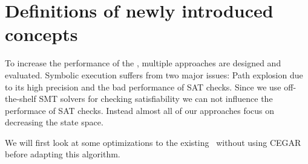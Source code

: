 \chapter{Definitions of newly introduced concepts}

To increase the performance of the \symbolicExecutionCPA, multiple approaches are designed and evaluated.
Symbolic execution suffers from two major issues:
Path explosion due to its high precision and the bad performance of SAT checks.
Since we use off-the-shelf SMT solvers for checking satisfiability we can not influence the performace of SAT checks.
Instead almost all of our approaches focus on decreasing the state space.

We will first look at some optimizations to the existing \symbolicExecutionCPA\ without using CEGAR before adapting this algorithm.





